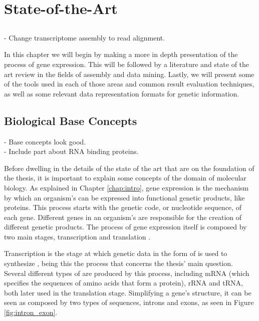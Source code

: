 \chapter{State-of-the-Art} \label{chap:sota}

\section*{}

\begin{Notes}
- Change transcriptome assembly to read alignment.\\
\end{Notes}

In this chapter we will begin by making a more in depth presentation of the
process of gene expression. This will be followed by a literature and state of
the art review in the fields of \trans{} assembly and data mining.
Lastly, we will present some of the tools used in each of those areas and
common result evaluation techniques, as well as some relevant data
representation formats for genetic information.

\section{Biological Base Concepts}

\begin{Notes}
- Base concepts look good.\\
- Include part about RNA binding proteins.\\
\end{Notes}

Before dwelling in the details of the state of the art that are on the
foundation of the thesis, it is important to explain some concepts of the
domain of molecular biology. As explained in Chapter \ref{chap:intro}, gene
expression is the mechanism by which an organism's \dna{} can be expressed into
functional genetic products, like proteins. This process starts with the
genetic code, or nucleotide sequence, of each gene. Different genes in an
organism's \dna{} are responsible for the creation of different genetic
products. The process of gene expression itself is composed by two main stages,
transcription and translation \cite{leic:gene_expr}.

Transcription is the stage at which genetic data in the form of \dna{} is used
to synthesize \rna{}, being this the process that concerns the thesis' main
question. Several different types of \rna{} are produced by this process,
including mRNA (which specifies the sequences of amino acids that form a
protein), rRNA and tRNA, both later used in the translation stage. Simplifying
a gene's structure, it can be seen as composed by two types of sequences,
introns and exons, as seen in Figure \ref{fig:intron_exon}.

